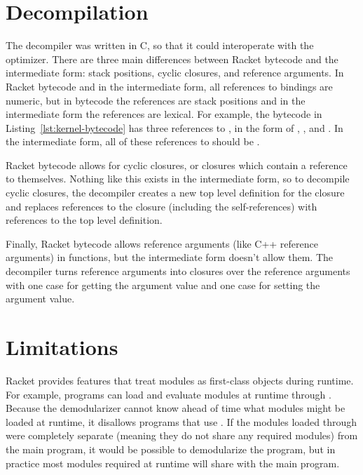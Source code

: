 \section{Decompilation}

The decompiler was written in C, so that it could interoperate with the optimizer.
There are three main differences between Racket bytecode and the intermediate form: stack positions, cyclic closures, and reference arguments.
In Racket bytecode and in the intermediate form, all references to bindings are numeric, but in bytecode the references are stack positions and in the intermediate form the references are lexical.
For example, the bytecode in Listing~\ref{lst:kernel-bytecode} has three references to , in the form of , , and . 
In the intermediate form, all of these references to  should be .

Racket bytecode allows for cyclic closures, or closures which contain a reference to themselves.
Nothing like this exists in the intermediate form, so to decompile cyclic closures, the decompiler creates a new top level definition for the closure and replaces references to the closure (including the self-references) with references to the top level definition.

Finally, Racket bytecode allows reference arguments (like C++ reference arguments) in functions, but the intermediate form doesn't allow them.
The decompiler turns reference arguments into  closures over the reference arguments with one case for getting the argument value and one case for setting the argument value. 


\section{Limitations}

Racket provides features that treat modules as first-class objects during runtime. 
For example, programs can load and evaluate modules at runtime through . 
Because the demodularizer cannot know ahead of time what modules might be loaded at runtime, it disallows programs that use .
If the modules loaded through  were completely separate (meaning they do not share any required modules) from the main program, it would be possible to demodularize the program, but in practice most modules required at runtime will share with the main program.

